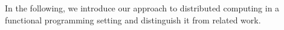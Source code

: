 \documentclass{llncs}
\begin{document}

\medskip

In the following, we introduce our approach to distributed
computing in a functional programming setting and distinguish it from
related work.
\end{document}
